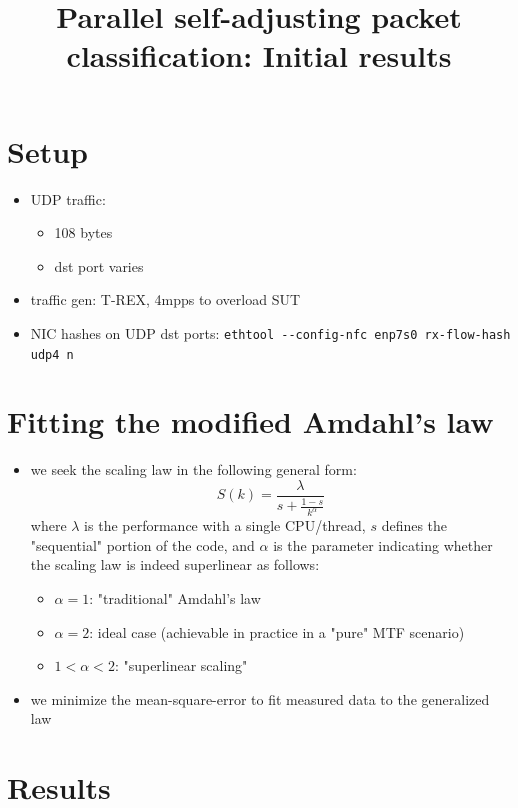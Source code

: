 \documentclass[11pt]{article}
\date{}
\title{Parallel self-adjusting packet classification: Initial results}
\begin{document}
\maketitle
{}
\frenchspacing

\section*{Setup}
\label{sec:org8b54939}
\begin{itemize}
\item UDP traffic:
\begin{itemize}
\item 108 bytes
\item dst port varies
\end{itemize}
\item traffic gen: T-REX, 4mpps to overload SUT
\item NIC hashes on UDP dst ports: \texttt{ethtool -{}-{}config-nfc enp7s0 rx-flow-hash udp4 n}
\end{itemize}

\section*{Fitting the modified Amdahl's law}
\label{sec:orgbdb51af}

\begin{itemize}
\item we seek the scaling law in the following general form:
$$S(k) = \frac{\lambda}{s + \frac{1-s}{k^\alpha}}$$
where \(\lambda\) is the performance with a single CPU/thread, \(s\) defines the "sequential" portion of
the code, and \(\alpha\) is the parameter indicating whether the scaling law is indeed superlinear
as follows:
\begin{itemize}
\item \(\alpha=1\): "traditional" Amdahl's law
\item \(\alpha=2\): ideal case (achievable in practice in a "pure" MTF scenario)
\item \(1 < \alpha < 2\): "superlinear scaling"
\end{itemize}
\item we minimize the mean-square-error to fit measured data to the generalized law
\end{itemize}

\section*{Results}
\label{sec:org671e70b}
\end{document}
